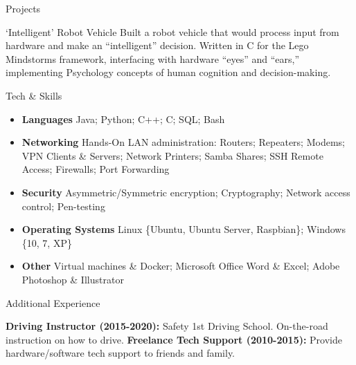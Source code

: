 \documentclass[]{mcdowellcv}
\begin{document}
\begin{cvsection}{Projects}
		\begin{cvsubsection}{‘Intelligent’ Robot Vehicle}{}{}		
			Built a robot vehicle that would process input from hardware and make an “intelligent” decision. \newline  
			Written in C for the Lego Mindstorms framework, interfacing with hardware “eyes” and “ears,” \newline 
			implementing Psychology concepts of human cognition and decision-making. 
		\end{cvsubsection}
	\end{cvsection}
	
	\begin{cvsection}{Tech \& Skills}
		\begin{cvsubsection}{}{}{}
			\begin{itemize}[itemsep=6pt]
				\item \textbf{Languages} Java; Python; C++; C; SQL; Bash 
				\item \textbf{Networking} Hands-On LAN administration: Routers; Repeaters; Modems; VPN Clients \& Servers; Network Printers; Samba Shares; SSH Remote Access; Firewalls; Port Forwarding 
				\item \textbf{Security} Asymmetric/Symmetric encryption; Cryptography; Network access control; Pen-testing
				\item \textbf{Operating Systems} Linux \{Ubuntu, Ubuntu Server, Raspbian\}; Windows \{10, 7, XP\}
				\item \textbf{Other} Virtual machines \& Docker; Microsoft Office Word \& Excel; Adobe Photoshop \& Illustrator
			\end{itemize}
		\end{cvsubsection}
	\end{cvsection}
	
	\begin{cvsection}{Additional Experience}
		\begin{cvsubsection}{}{}{}	
			\textbf{Driving Instructor (2015-2020):} Safety 1st Driving School. On-the-road instruction on how to drive.
			\textbf{Freelance Tech Support (2010-2015):} Provide hardware/software tech support to friends and family.
		\end{cvsubsection}
	\end{cvsection}
	
\end{document}
